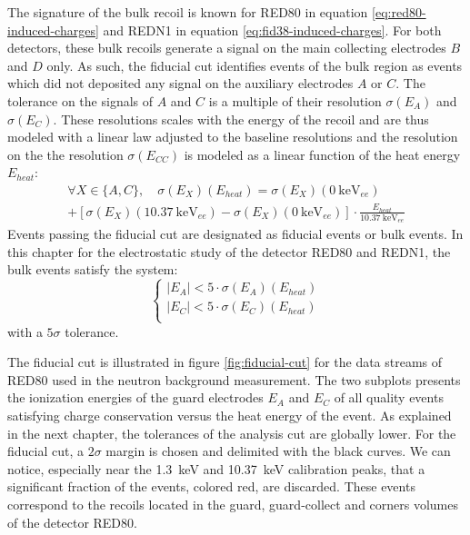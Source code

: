 The signature of the bulk recoil is known for RED80 in equation \ref{eq:red80-induced-charges} and REDN1 in equation \ref{eq:fid38-induced-charges}. For both detectors, these bulk recoils generate a signal on the main collecting electrodes $B$ and $D$ only. As such, the fiducial cut identifies events of the bulk region as events which did not deposited any signal on the auxiliary electrodes $A$ or $C$. The tolerance on the signals of $A$ and $C$ is a multiple of their resolution $\sigma(E_A)$ and $\sigma(E_C)$. These resolutions scales with the energy of the recoil and are thus modeled with a linear law adjusted to the baseline resolutions and the resolution on the 
the resolution $\sigma(E_{CC})$ is modeled as a linear function of the heat energy $E_{heat}$:
\begin{multline}
\label{eq:fiducial-cut-resolution}
\forall X \in \{A, C \}, \quad 
\sigma(E_{X})(E_{heat})
=
\sigma(E_{X})(\SI{0}{\kilo\eV_{ee}}) \\ + \left[ \sigma(E_{X})(\SI{10.37}{\kilo\eV_{ee}}) - \sigma(E_{X})(\SI{0}{\kilo\eV_{ee}}) \right] \cdot \frac{E_{heat}}{\SI{10.37}{\kilo\eV_{ee}}}
\end{multline}
Events passing the fiducial cut are designated as fiducial events or bulk events. In this chapter for the electrostatic study of the detector RED80 and REDN1, the bulk events satisfy the system:
\begin{equation}
\begin{cases}
|E_A| < 5 \cdot \sigma(E_A)(E_{heat}) \\
|E_C| < 5 \cdot \sigma(E_C)(E_{heat}) \\
\end{cases}
\end{equation}
with a $5\sigma$ tolerance.

The fiducial cut is illustrated in figure \ref{fig:fiducial-cut} for the data streams of RED80 used in the neutron background measurement. The two subplots presents the ionization energies of the guard electrodes $E_A$ and $E_C$ of all quality events satisfying charge conservation versus the heat energy of the event. As explained in the next chapter, the tolerances of the analysis cut are globally lower. For the fiducial cut, a $2\sigma$ margin is chosen and delimited with the black curves. We can notice, especially near the \SI{1.3}{\kilo\eV} and \SI{10.37}{\kilo\eV} calibration peaks, that a significant fraction of the events, colored red, are discarded. These events correspond to the recoils located in the guard, guard-collect and corners volumes of the detector RED80.

